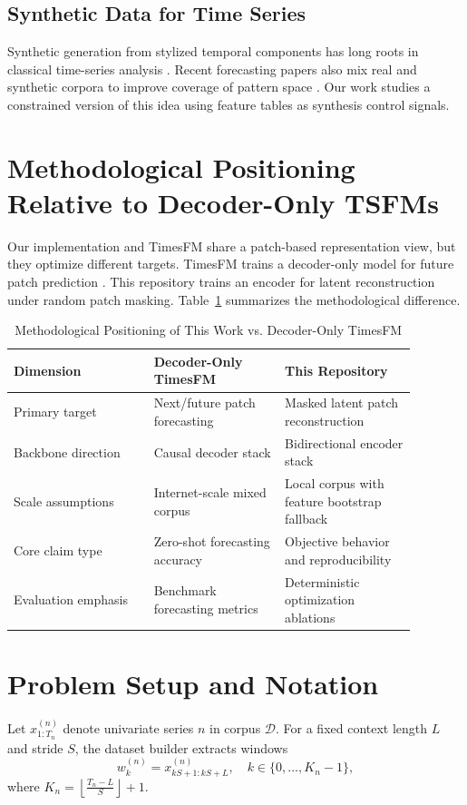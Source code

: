 \documentclass[conference]{IEEEtran}
\begin{document}
\subsection{Synthetic Data for Time Series}
Synthetic generation from stylized temporal components has long roots in classical time-series analysis \cite{box2015}. Recent forecasting papers also mix real and synthetic corpora to improve coverage of pattern space \cite{timesfm}. Our work studies a constrained version of this idea using feature tables as synthesis control signals.

\section{Methodological Positioning Relative to Decoder-Only TSFMs}
Our implementation and TimesFM share a patch-based representation view, but they optimize different targets. TimesFM trains a decoder-only model for future patch prediction \cite{timesfm}. This repository trains an encoder for latent reconstruction under random patch masking. Table~\ref{tab:positioning} summarizes the methodological difference.

\begin{table}[t]
\caption{Methodological Positioning of This Work vs. Decoder-Only TimesFM}
\label{tab:positioning}
\centering
\begin{tabular}{p{0.30\linewidth}p{0.29\linewidth}p{0.29\linewidth}}
\toprule
Dimension & Decoder-Only TimesFM & This Repository \\
\midrule
Primary target & Next/future patch forecasting & Masked latent patch reconstruction \\
Backbone direction & Causal decoder stack & Bidirectional encoder stack \\
Scale assumptions & Internet-scale mixed corpus & Local corpus with feature bootstrap fallback \\
Core claim type & Zero-shot forecasting accuracy & Objective behavior and reproducibility \\
Evaluation emphasis & Benchmark forecasting metrics & Deterministic optimization ablations \\
\bottomrule
\end{tabular}
\end{table}

\section{Problem Setup and Notation}
Let $x^{(n)}_{1:T_n}$ denote univariate series $n$ in corpus $\mathcal{D}$. For a fixed context length $L$ and stride $S$, the dataset builder extracts windows
\begin{equation}
w^{(n)}_k = x^{(n)}_{kS+1:kS+L}, \quad k \in \{0,\ldots,K_n-1\},
\label{eq:window}
\end{equation}
where $K_n = \left\lfloor \frac{T_n-L}{S} \right\rfloor + 1$.
\end{document}

